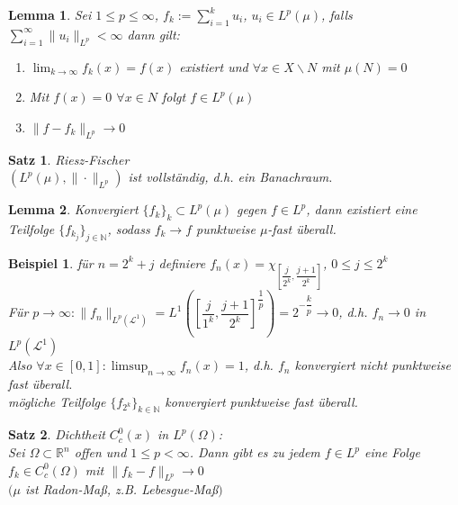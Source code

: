 \documentclass[11pt]{memoir}
\theoremstyle{changebreak}
\newtheorem{Beispiel}{Beispiel}[chapter]
\newtheorem{Lemma}{Lemma}[chapter]
\newtheorem{Satz}{Satz}[chapter]
\begin{document}
\begin{Lemma}
Sei $1 \leq p \leq \infty$, $f_k := \sum\limits_{i=1}^k u_i$, $u_i \in L^p(\mu)$, falls $\sum\limits_{i=1}^\infty \|u_i\|_{L^p} < \infty$ dann gilt:
\begin{enumerate}
	\item $\lim_{k \rightarrow \infty} f_k (x) = f(x)$ existiert und $\forall x \in X\backslash N$ mit $\mu(N) =0$
	\item Mit $f(x) = 0$ $\forall x \in N$ folgt $f \in L^p(\mu)$
	\item $\|f-f_k\|_{L^p} \rightarrow 0$
\end{enumerate}
\end{Lemma}





\begin{Satz}
\emph{Riesz-Fischer} \\
$\left(L^p(\mu), \|\cdotp\|_{L^p}\right)$ ist vollständig, d.h. ein Banachraum. 
\end{Satz}

\begin{Lemma}
Konvergiert $\{f_k\}_k \subset L^p (\mu)$ gegen $f \in L^p$, dann existiert eine Teilfolge $\{f_{k_j}\}_{j \in \mathbb N}$, sodass $f_k \rightarrow f$ punktweise $\mu$-fast überall.
\end{Lemma}

\begin{Beispiel}
für $n = 2^k + j$ definiere $f_n(x) = \chi_{\left[\dfrac{j}{2^k}, \dfrac{j+1}{2^k}\right]}$, $0 \leq j \leq 2^k$ \\
Für $p \rightarrow \infty: \|f_n\|_{L^p(\mathscr L^1)} = L^1\left(\left[\dfrac{j}{1^k}, \dfrac{j+1}{2^k} \right] ^{\dfrac{1}{p}} \right) = 2^{-\dfrac{k}{p}} \rightarrow 0$, d.h. $f_n \rightarrow 0$ in $L^p(\mathscr L^1)$ \\
Also $\forall x \in [0, 1]: \limsup_{n \rightarrow \infty} f_n (x) = 1$, d.h. $f_n$ konvergiert nicht punktweise fast überall. \\
mögliche Teilfolge $\{f_{2^k}\}_{k \in \mathbb N}$ konvergiert punktweise fast überall.
\end{Beispiel}

\begin{Satz}
\emph{Dichtheit $C^0_c (x)$ in $L^p(\Omega)$}: \\
Sei $\Omega \subset \mathbb R^n$ offen und $1 \leq p < \infty$. Dann gibt es zu jedem $f \in L^p$ eine Folge $f_k \in C^0_c (\Omega)$ mit $\|f_k - f\|_{L^p} \rightarrow 0$\\
$(\mu$ ist Radon-Maß, z.B. Lebesgue-Maß$)$
\end{Satz}
\end{document}
